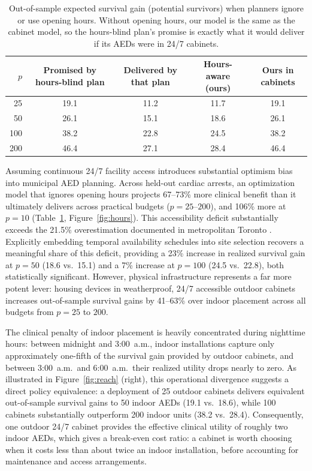 \documentclass[11pt]{article}
\begin{document}
\begin{table}[htbp]
\centering\small
\begin{tabular}{rcccc}
\toprule
$p$ & Promised by hours-blind plan & Delivered by that plan & Hours-aware (ours) & Ours in cabinets\\
\midrule
25  & 19.1 & 11.2 & 11.7 & 19.1\\
50  & 26.1 & 15.1 & 18.6 & 26.1\\
100 & 38.2 & 22.8 & 24.5 & 38.2\\
200 & 46.4 & 27.1 & 28.4 & 46.4\\
\bottomrule
\end{tabular}
\caption{Out-of-sample expected survival gain (potential survivors) when planners ignore or use opening hours. Without opening hours, our model is the same as the cabinet model, so the hours-blind plan's promise is exactly what it would deliver if its AEDs were in 24/7 cabinets.}
\label{tab:hours}
\end{table}

Assuming continuous 24/7 facility access introduces substantial optimism bias into municipal AED planning. Across held-out cardiac arrests, an optimization model that ignores opening hours projects 67--73\% more clinical benefit than it ultimately delivers across practical budgets ($p=25$--$200$), and 106\% more at $p=10$ (Table~\ref{tab:hours}, Figure~\ref{fig:hours}). This accessibility deficit substantially exceeds the 21.5\% overestimation documented in metropolitan Toronto \cite{sun2016}. Explicitly embedding temporal availability schedules into site selection recovers a meaningful share of this deficit, providing a 23\% increase in realized survival gain at $p=50$ (18.6 vs.\ 15.1) and a 7\% increase at $p=100$ (24.5 vs.\ 22.8), both statistically significant. However, physical infrastructure represents a far more potent lever: housing devices in weatherproof, 24/7 accessible outdoor cabinets increases out-of-sample survival gains by 41--63\% over indoor placement across all budgets from $p=25$ to $200$.

The clinical penalty of indoor placement is heavily concentrated during nighttime hours: between midnight and 3:00~a.m., indoor installations capture only approximately one-fifth of the survival gain provided by outdoor cabinets, and between 3:00~a.m.\ and 6:00~a.m.\ their realized utility drops nearly to zero. As illustrated in Figure~\ref{fig:reach} (right), this operational divergence suggests a direct policy equivalence: a deployment of 25 outdoor cabinets delivers equivalent out-of-sample survival gains to 50 indoor AEDs (19.1 vs.\ 18.6), while 100 cabinets substantially outperform 200 indoor units (38.2 vs.\ 28.4). Consequently, one outdoor 24/7 cabinet provides the effective clinical utility of roughly two indoor AEDs, which gives a break-even cost ratio: a cabinet is worth choosing when it costs less than about twice an indoor installation, before accounting for maintenance and access arrangements.
\end{document}
